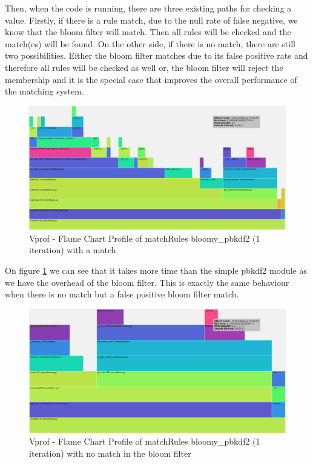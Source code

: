 \documentclass{eplmastersthesis}
\begin{document}
Then, when the code is running, there are three existing paths for checking a value. Firstly, if there is a rule match, due to the null rate of false negative, we know that the bloom filter will match. Then all rules will be checked and the match(es) will be found. On the other side, if there is no match, there are still two possibilities. Either the bloom filter matches due to its false positive rate and therefore all rules will be checked as well or, the bloom filter will reject the membership and it is the special case that improves the overall performance of the matching system.\\


\begin{figure}[h!]
\begin{center}
	\includegraphics[scale=0.3]{res/match-exist}
	\caption{Vprof - Flame Chart Profile of matchRules bloomy\_pbkdf2 (1 iteration) with a match}
	\label{profile-bloomy-match}
\end{center}
\end{figure}

On figure \ref{profile-bloomy-match} we can see that it takes more time than the simple \gls{pbkdf2} module as we have the overhead of the bloom filter. This is exactly the same behaviour when there is no match but a false positive bloom filter match.\\

\begin{figure}[h!]
\begin{center}
	\includegraphics[scale=0.3]{res/match-bloom-not}
	\caption{Vprof - Flame Chart Profile of matchRules bloomy\_pbkdf2 (1 iteration) with no match in the bloom filter}
	\label{profile-bloomy-no-match}
\end{center}
\end{figure}
\end{document}
